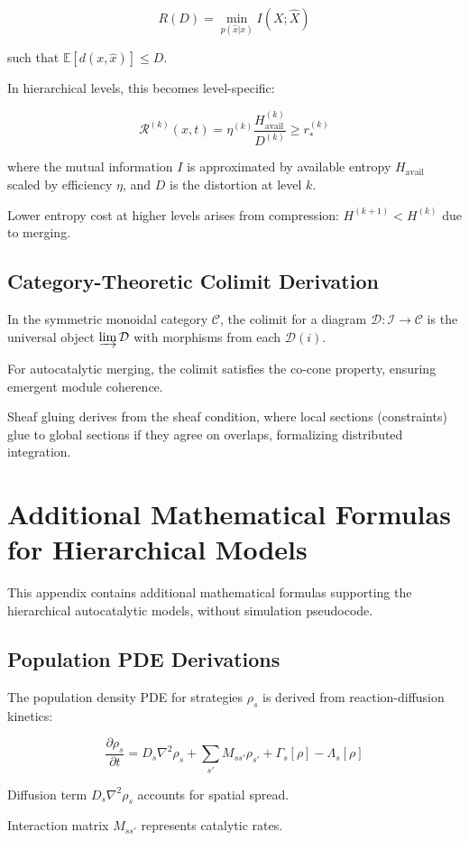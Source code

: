 \documentclass{book}
\begin{document}
\[R(D) = \min_{p(\hat{x}|x)} I(X; \hat{X})\]

such that $\mathbb{E}[d(x, \hat{x})] \le D$.

In hierarchical levels, this becomes level-specific:

\[ \mathcal{R}^{(k)}(x,t) = \eta^{(k)} \frac{H^{(k)}_{\mathrm{avail}}}{D^{(k)}} \ge r_\ast^{(k)} \]

where the mutual information $I$ is approximated by available entropy $H_{\mathrm{avail}}$ scaled by efficiency $\eta$, and $D$ is the distortion at level $k$.

Lower entropy cost at higher levels arises from compression: $H^{(k+1)} < H^{(k)}$ due to merging.

\section{Category-Theoretic Colimit Derivation}
In the symmetric monoidal category $\mathcal{C}$, the colimit for a diagram $\mathcal{D}: \mathcal{I} \to \mathcal{C}$ is the universal object $\varinjlim \mathcal{D}$ with morphisms from each $\mathcal{D}(i)$.

For autocatalytic merging, the colimit satisfies the co-cone property, ensuring emergent module coherence.

Sheaf gluing derives from the sheaf condition, where local sections (constraints) glue to global sections if they agree on overlaps, formalizing distributed integration.

\chapter{Additional Mathematical Formulas for Hierarchical Models}
This appendix contains additional mathematical formulas supporting the hierarchical autocatalytic models, without simulation pseudocode.

\section{Population PDE Derivations}
The population density PDE for strategies $\rho_s$ is derived from reaction-diffusion kinetics:

\[\frac{\partial \rho_s}{\partial t} = D_s \nabla^2 \rho_s + \sum_{s'} M_{ss'} \rho_{s'} + \Gamma_s[\rho] - \Lambda_s[\rho]\]

Diffusion term $D_s \nabla^2 \rho_s$ accounts for spatial spread.

Interaction matrix $M_{ss'}$ represents catalytic rates.
\end{document}
